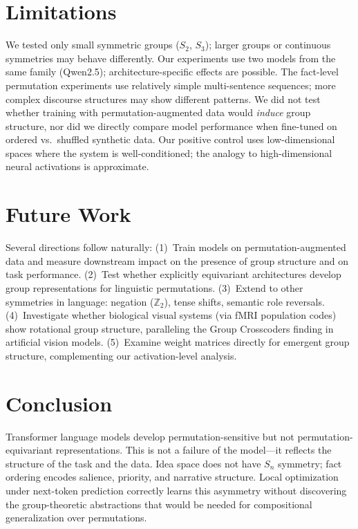 \documentclass[10pt, letterpaper]{article}
\begin{document}
\section{Limitations}
\label{sec:limitations}

We tested only small symmetric groups ($S_2$, $S_3$); larger groups or continuous symmetries may behave differently. Our experiments use two models from the same family (Qwen2.5); architecture-specific effects are possible. The fact-level permutation experiments use relatively simple multi-sentence sequences; more complex discourse structures may show different patterns. We did not test whether training with permutation-augmented data would \emph{induce} group structure, nor did we directly compare model performance when fine-tuned on ordered vs.\ shuffled synthetic data. Our positive control uses low-dimensional spaces where the system is well-conditioned; the analogy to high-dimensional neural activations is approximate.

\section{Future Work}
\label{sec:future}

Several directions follow naturally: (1)~Train models on permutation-augmented data and measure downstream impact on the presence of group structure and on task performance. (2)~Test whether explicitly equivariant architectures develop group representations for linguistic permutations. (3)~Extend to other symmetries in language: negation ($\mathbb{Z}_2$), tense shifts, semantic role reversals. (4)~Investigate whether biological visual systems (via fMRI population codes) show rotational group structure, paralleling the Group Crosscoders finding in artificial vision models. (5)~Examine weight matrices directly for emergent group structure, complementing our activation-level analysis.

\section{Conclusion}
\label{sec:conclusion}

Transformer language models develop permutation-sensitive but not permutation-equivariant representations. This is not a failure of the model---it reflects the structure of the task and the data. Idea space does not have $S_n$ symmetry; fact ordering encodes salience, priority, and narrative structure. Local optimization under next-token prediction correctly learns this asymmetry without discovering the group-theoretic abstractions that would be needed for compositional generalization over permutations.
\end{document}
